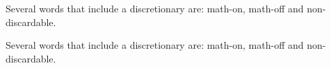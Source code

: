\def\tstoryB{Several words that include a discretionary are: math-on, math-off and non-discardable.}
\tstoryB\par
{}\tstoryB\par
\bye
